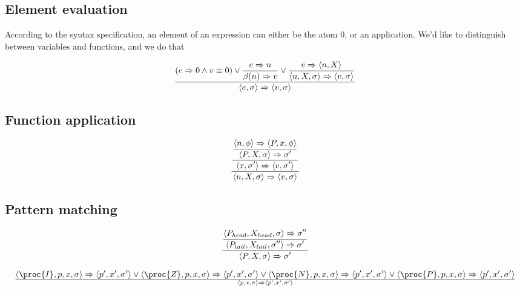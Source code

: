 \subsection{Element evaluation}

According to the syntax specification, an element of an expression can either
be the atom $0$, or an application. We'd like to distinguish between variables
and functions, and we do that  

\begin{equation}
{\displaystyle
\left(
    e\Rightarrow 0
  \wedge
    v\equiv 0
\right)
\vee
{\displaystyle
    e\Rightarrow n
\over\displaystyle
    \beta(n)\Rightarrow v
}
\vee
{\displaystyle
    e\Rightarrow \left\langle n, X\right\rangle
\over\displaystyle
    \left\langle n,X,\sigma\right\rangle
    \Rightarrow
    \left\langle v,\sigma\right\rangle
}
\over\displaystyle
\left\langle e,\sigma\right\rangle
\Rightarrow
\left\langle v,\sigma\right\rangle
}
\end{equation}

\subsection{Function application}

\begin{equation}
{\displaystyle
{\displaystyle
{\displaystyle
  \left\langle n, \phi\right\rangle
  \Rightarrow
  \left\langle P, x, \phi\right\rangle
\over\displaystyle
  \left\langle P, X, \sigma\right\rangle
  \Rightarrow
  \sigma'
}
\over\displaystyle
  \left\langle x, \sigma'\right\rangle
  \Rightarrow
  \left\langle v,\sigma'\right\rangle
}
\over\displaystyle
    \left\langle n,X,\sigma\right\rangle
    \Rightarrow
    \left\langle v,\sigma\right\rangle
}
\end{equation}

\subsection{Pattern matching}

\begin{equation}
{\displaystyle
{\displaystyle
  \left\langle P_{head}, X_{head}, \sigma\right\rangle
  \Rightarrow
  \sigma''
\over\displaystyle
  \left\langle P_{tail}, X_{tail}, \sigma''\right\rangle
  \Rightarrow
  \sigma'
}
\over\displaystyle
  \left\langle P, X, \sigma\right\rangle
  \Rightarrow
  \sigma'
}
\end{equation}

\begin{equation}
{
  \left\langle\proc{I}, p,x,\sigma\right\rangle
  \Rightarrow
  \left\langle p',x',\sigma'\right\rangle
\vee
  \left\langle\proc{Z}, p,x,\sigma\right\rangle
  \Rightarrow
  \left\langle p',x',\sigma'\right\rangle
\vee
  \left\langle\proc{N}, p,x,\sigma\right\rangle
  \Rightarrow
  \left\langle p',x',\sigma'\right\rangle
\vee
  \left\langle\proc{P}, p,x,\sigma\right\rangle
  \Rightarrow
  \left\langle p',x',\sigma'\right\rangle
}\over{
  \left\langle p, x, \sigma\right\rangle
  \Rightarrow
  \left\langle p', x', \sigma'\right\rangle
}
\end{equation}

